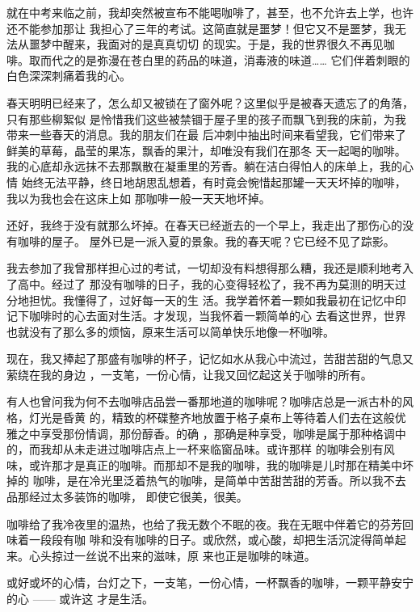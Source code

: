 \documentclass[12pt,a4paper]{article}
\begin{document}
		就在中考来临之前，我却突然被宣布不能喝咖啡了，甚至，也不允许去上学，也许还不能参加那让
	我担心了三年的考试。这简直就是噩梦！但它又不是噩梦，我无法从噩梦中醒来，我面对的是真真切切
	的现实。于是，我的世界很久不再见咖啡。取而代之的是弥漫在苍白里的药品的味道，消毒液的味道……
	它们伴着刺眼的白色深深刺痛着我的心。

		春天明明已经来了，怎么却又被锁在了窗外呢？这里似乎是被春天遗忘了的角落，只有那些柳絮似
	是怜惜我们这些被禁锢于屋子里的孩子而飘飞到我的床前，为我带来一些春天的消息。我的朋友们在最
	后冲刺中抽出时间来看望我，它们带来了鲜美的草莓，晶莹的果冻，飘香的果汁，却唯没有我们在那冬
	天一起喝的咖啡。我的心底却永远抹不去那飘散在凝重里的芳香。躺在洁白得怕人的床单上，我的心情
	始终无法平静，终日地胡思乱想着，有时竟会惋惜起那罐一天天坏掉的咖啡，我以为我也会在这床上如
	那咖啡一般一天天地坏掉。

		还好，我终于没有就那么坏掉。在春天已经逝去的一个早上，我走出了那伤心的没有咖啡的屋子。
	屋外已是一派入夏的景象。我的春天呢？它已经不见了踪影。

		我去参加了我曾那样担心过的考试，一切却没有料想得那么糟，我还是顺利地考入了高中。经过了
	那没有咖啡的日子，我的心变得轻松了，我不再为莫测的明天过分地担忧。我懂得了，过好每一天的生
	活。我学着怀着一颗如我最初在记忆中印记下咖啡时的心去面对生活。才发现，当我怀着一颗简单的心
	去看这世界，世界也就没有了那么多的烦恼，原来生活可以简单快乐地像一杯咖啡。

		现在，我又捧起了那盛有咖啡的杯子，记忆如水从我心中流过，苦甜苦甜的气息又萦绕在我的身边
	，一支笔，一份心情，让我又回忆起这关于咖啡的所有。

		有人也曾问我为何不去咖啡店品尝一番那地道的咖啡呢？咖啡店总是一派古朴的风格，灯光是昏黄
	的，精致的杯碟整齐地放置于格子桌布上等待着人们去在这般优雅之中享受那份情调，那份醇香。的确
	，那确是种享受，咖啡是属于那种格调中的，而我却从未走进过咖啡店点上一杯来临窗品味。或许那样
	的咖啡会别有风味，或许那才是真正的咖啡。而那却不是我的咖啡，我的咖啡是儿时那在精美中坏掉的
	咖啡，是在冷光里泛着热气的咖啡，是简单中苦甜苦甜的芳香。所以我不去品那经过太多装饰的咖啡，
	即使它很美，很美。

		咖啡给了我冷夜里的温热，也给了我无数个不眠的夜。我在无眠中伴着它的芬芳回味着一段段有咖
	啡和没有咖啡的日子。或欣然，或心酸，却把生活沉淀得简单起来。心头掠过一丝说不出来的滋味，原
	来也正是咖啡的味道。

		或好或坏的心情，台灯之下，一支笔，一份心情，一杯飘香的咖啡，一颗平静安宁的心 —— 或许这
	才是生活。

	\endwriting


\end{document}
